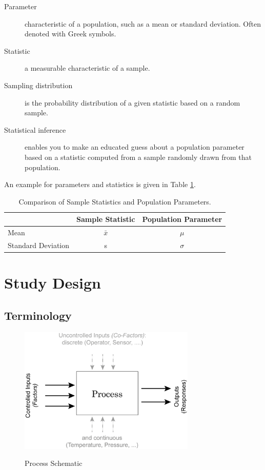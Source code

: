 \begin{description}
  \item[Parameter] characteristic of a population, such as a mean or standard deviation. Often denoted with Greek symbols.
  \item[Statistic] a measurable characteristic of a sample.
  \item[Sampling distribution] is the probability distribution of a given statistic based on a random sample.
  \item[Statistical inference] enables you to make an educated guess about a population parameter based on a statistic computed from a sample randomly drawn from that population.
\end{description}

An example for parameters and statistics is given in Table \ref{table:population}.

\begin{table}[ht]

  \centering
    \begin{tabular}{|l|c|c|}
      \hline
       & Sample Statistic & Population Parameter \\
       \hline
      Mean & $\bar{x}$ & $\mu$ \\
      Standard Deviation & s & $\sigma$ \\
      \hline
    \end{tabular}
    \caption{Comparison of Sample Statistics and Population Parameters.}
    \label{table:population}
\end{table}


\section{Study Design}

\subsection{Terminology}

\begin{figure}
  \centering
  \includegraphics[width=0.75\textwidth]{../Images/Process_Optimization.jpg}\\
  \caption{Process Schematic}\label{fig:StudyDesign}
\end{figure}

